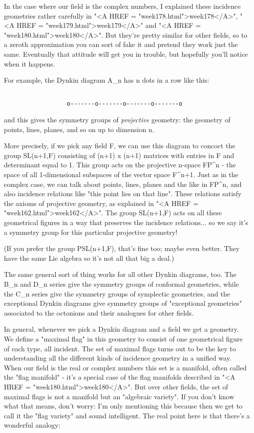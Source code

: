 In the case where our field is the complex numbers, I explained these
incidence geometries rather carefully in "<A HREF =
"week178.html">week178</A>", "<A HREF =
"week179.html">week179</A>" and "<A HREF =
"week180.html">week180</A>".  But they're pretty similar for other
fields, so to a zeroth approximation you can sort of fake it and pretend
they work just the same.  Eventually that attitude will get you in
trouble, but hopefully you'll notice when it happens.

For example, the Dynkin diagram A_{n} has n dots in a row like this:



\begin{verbatim}

                  o-------o-------o-------o-------o
\end{verbatim}
    
and this gives the symmetry groups of \emph{projective} geometry: the
geometry of points, lines, planes, and so on up to dimension n.

More precisely, if we pick any field F, we can use this diagram to
concoct the group SL(n+1,F) consisting of (n+1) x (n+1) matrices with
entries in F and determinant equal to 1.  This group acts on the
projective n-space FP^{n} - the space of all 1-dimensional
subspaces of the vector space F^{n+1}.  Just as in the complex
case, we can talk about points, lines, planes and the like in
FP^{n}, and also incidence relations like "this point lies
on that line".  These relations satisfy the axioms of projective
geometry, as explained in "<A HREF =
"week162.html">week162</A>".  The group SL(n+1,F) acts on all these
geometrical figures in a way that preserves the incidence
relations... so we say it's a symmetry group for this particular
projective geometry!

(If you prefer the group PSL(n+1,F), that's fine too; maybe even better.
They have the same Lie algebra so it's not all that big a deal.)

The same general sort of thing works for all other Dynkin diagrams, too.
The B_{n} and D_{n} series give the symmetry groups of
conformal geometries, while the C_{n} series give the symmetry
groups of symplectic geometries, and the exceptional Dynkin diagrams
give symmetry groups of "exceptional geometries" associated to
the octonions and their analogues for other fields.

In general, whenever we pick a Dynkin diagram and a field we get a
geometry.  We define a "maximal flag" in this geometry to
consist of one geometrical figure of each type, all incident.  The set
of maximal flags turns out to be the key to understanding all the
different kinds of incidence geometry in a unified way.  When our field
is the real or complex numbers this set is a manifold, often called the
"flag manifold" - it's a special case of the flag manifolds
described in "<A HREF = "week180.html">week180</A>".  But over
other fields, the set of maximal flags is not a manifold but an
"algebraic variety".  If you don't know what that means, don't
worry: I'm only mentioning this because then we get to call it the
"flag variety" and sound intelligent.  The real point here is
that there's a wonderful analogy:


